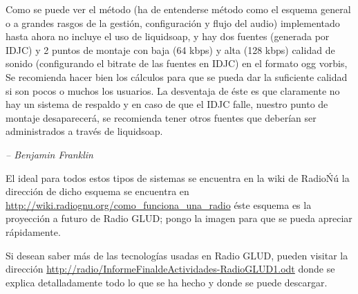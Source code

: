 
\begin{center}
\end{center}

\begin{multicols}{2}

Como se puede ver el método (ha de entenderse método como el esquema general o a grandes rasgos de la gestión, configuración y flujo del audio) implementado hasta ahora no incluye el uso de liquidsoap, y hay dos fuentes (generada por IDJC) y 2 puntos de montaje con baja (64 kbps) y alta (128 kbps) calidad de sonido (configurando el bitrate de las fuentes en IDJC) en el formato ogg vorbis, Se recomienda hacer bien los cálculos para que se pueda dar la suficiente calidad si son pocos o muchos los usuarios.\cite{ref5} La desventaja de éste es que claramente no hay un sistema de respaldo y en caso de que el IDJC falle, nuestro punto de montaje desaparecerá, se recomienda tener otros fuentes que deberían ser administrados a través de liquidsoap.

\begin{entradilla} %
{\em {\color{introcolor}{``Aquel que sacrifica la libertad por seguridad, no merece ninguna de las dos''}} -- Benjamin Franklin}
\end{entradilla}

El ideal para todos estos tipos de sistemas se encuentra en la wiki de RadioŃú la dirección de dicho esquema se encuentra en \url{http://wiki.radiognu.org/como_funciona_una_radio} éste esquema es la proyección a futuro de Radio GLUD; pongo la imagen para que se pueda apreciar rápidamente.

\begin{center}
\end{center}

Si desean saber más de las tecnologías usadas en Radio GLUD, pueden visitar la dirección \url{http://radio/InformeFinaldeActividades-RadioGLUD1.odt} donde se explica detalladamente todo lo que se ha hecho y donde se puede descargar.


\end{multicols}
